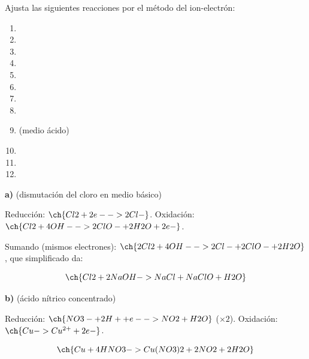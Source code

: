 \begin{exercise}
    Ajusta las siguientes reacciones por el método del ion-electrón:

    \begin{enumerate}[label=\letraminuscula]
        \item {}
        \item {}
        \item {}
        \item {}
        \item {}
        \item {}
        \item {}
        \item {}
        \item {} (medio ácido)
        \item {}
        \item {}
        \item {}
    \end{enumerate}
    \begin{solu}

        \textbf{a) } (dismutación del cloro en medio básico)

        Reducción: \(\ch{Cl2 + 2 e- -> 2 Cl-}\). Oxidación: \(\ch{Cl2 + 4 OH- -> 2 ClO- + 2 H2O + 2 e-}\).

        Sumando (mismos electrones): \(\ch{2 Cl2 + 4 OH- -> 2 Cl- + 2 ClO- + 2 H2O}\), que simplificado da:

        \begin{equation*}
            \ch{Cl2 + 2 NaOH -> NaCl + NaClO + H2O}
        \end{equation*}

        \textbf{b) } (ácido nítrico concentrado)

        Reducción: \(\ch{NO3- + 2 H+ + e- -> NO2 + H2O}\) (\(\times 2\)). Oxidación: \(\ch{Cu -> Cu^{2+} + 2 e-}\).

        \begin{equation*}
            \ch{Cu + 4 HNO3 -> Cu(NO3)2 + 2 NO2 + 2 H2O}
        \end{equation*}


\end{solu}
\end{exercise}
